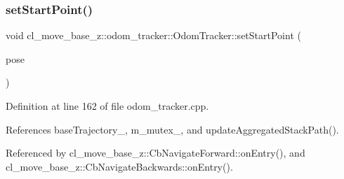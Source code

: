 \subsubsection{\texorpdfstring{set\+Start\+Point()}{setStartPoint()}\hspace{0.1cm}{\footnotesize\ttfamily [1/2]}}
{\footnotesize\ttfamily void cl\+\_\+move\+\_\+base\+\_\+z\+::odom\+\_\+tracker\+::\+Odom\+Tracker\+::set\+Start\+Point (\begin{DoxyParamCaption}\item[{const geometry\+\_\+msgs\+::\+Pose\+Stamped \&}]{pose }\end{DoxyParamCaption})}



Definition at line 162 of file odom\+\_\+tracker.\+cpp.



References base\+Trajectory\+\_\+, m\+\_\+mutex\+\_\+, and update\+Aggregated\+Stack\+Path().



Referenced by cl\+\_\+move\+\_\+base\+\_\+z\+::\+Cb\+Navigate\+Forward\+::on\+Entry(), and cl\+\_\+move\+\_\+base\+\_\+z\+::\+Cb\+Navigate\+Backwards\+::on\+Entry().


